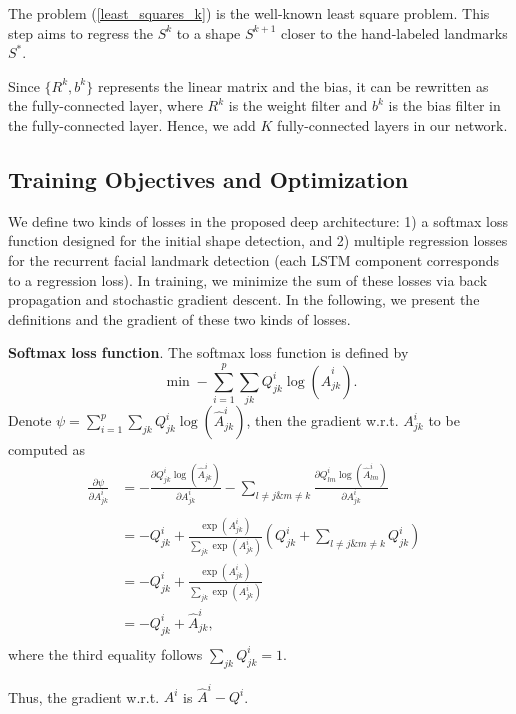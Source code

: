 \documentclass[journal]{IEEEtran}
\begin{document}
The problem (\ref{least_squares_k}) is the well-known least square problem. This step aims to regress the $S^{k}$ to a shape $S^{k+1}$ closer to the hand-labeled landmarks $S^{*}$.

Since $\{R^k, b^k\}$ represents the linear matrix and the bias, it can be rewritten as the fully-connected layer, where $R^k$ is the weight filter and $b^k$ is the bias filter in the fully-connected layer. Hence, we add $K$ fully-connected layers in our network.


\subsection{Training Objectives and Optimization}
We define two kinds of losses in the proposed deep architecture: 1) a softmax loss function designed for the initial shape detection, and 2) multiple regression losses for the recurrent facial landmark detection (each LSTM component corresponds to a regression loss). In training, we minimize the sum of these losses via back propagation and stochastic gradient descent. In the following, we present the definitions and the gradient of these two kinds of losses.

\textbf{Softmax loss function}. The softmax loss function is defined by
\begin{equation}
 \min - \sum_{i=1}^p \sum_{jk} Q^i_{jk} \log( \hat{A}^i_{jk}).
\end{equation}
Denote $\psi = \sum_{i=1}^p \sum_{jk} Q^i_{jk} \log( \hat{A}^i_{jk})$, then the gradient w.r.t. $A^i_{jk}$ to be computed as
\begin{equation}
\begin{aligned}
 \frac{\partial \psi}{\partial A^i_{jk} } & = - \frac{\partial Q^i_{jk} \log(\hat{A}^i_{jk})}{\partial A^i_{jk}} - \sum_{l \neq j \&  m \neq k} \frac{\partial Q^i_{lm} \log(\hat{A}^i_{lm})}{\partial A^i_{jk}}& \\
\\
& = -Q^i_{jk}  +  \frac{\exp(A^i_{jk})}{\sum_{jk} \exp(A^i_{jk})} 	 \left( Q^i_{jk} + \sum_{l \neq j \&  m \neq k} Q^i_{jk} \right)  & \\
& =- Q^i_{jk}  + \frac{\exp(A^i_{jk})}{\sum_{jk} \exp(A^i_{jk})}& \\
& = - Q^i_{jk} + \hat{A}^i_{jk}, & \\
 \end{aligned}
\end{equation}
where the third equality follows  $\sum_{jk} Q_{jk}^i = 1$.

Thus, the gradient w.r.t. $A^i$ is $\hat{A}^i - Q^i$.
\end{document}
